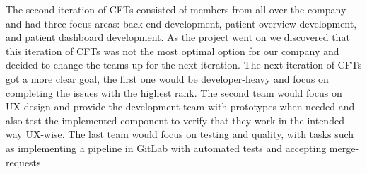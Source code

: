 The second iteration of CFTs consisted of members from all over the company and had three focus areas: back-end development, patient overview development, and patient dashboard development. As the project went on we discovered that this iteration of CFTs was not the most optimal option for our company and decided to change the teams up for the next iteration. The next iteration of CFTs got a more clear goal, the first one would be developer-heavy and focus on completing the issues with the highest rank. The second team would focus on UX-design and provide the development team with prototypes when needed and also test the implemented component to verify that they work in the intended way UX-wise. The last team would focus on testing and quality, with tasks such as implementing a pipeline in GitLab with automated tests and accepting merge-requests.




